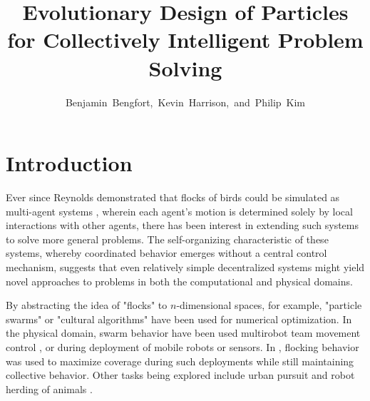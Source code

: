 \documentclass[12pt,journal,compsoc]{IEEEtran}
\begin{document}
\title{Evolutionary Design of Particles for Collectively Intelligent Problem Solving}
\author{Benjamin~Bengfort,~Kevin~Harrison,~and~Philip~Kim}


\maketitle

\IEEEdisplaynotcompsoctitleabstractindextext

\section{Introduction}

Ever since Reynolds demonstrated that flocks of birds could be simulated as multi-agent systems \cite{reynolds1987flocks}, wherein each agent's motion is determined solely by local interactions with other agents, there has been interest in extending such systems to solve more general problems. The self-organizing characteristic of these systems, whereby coordinated behavior emerges without a central control mechanism, suggests that even relatively simple decentralized systems might yield novel approaches to problems in both the computational and physical domains.

By abstracting the idea of "flocks" to $n$-dimensional spaces, for example, "particle swarms" \cite{kennedy1995particle,clerc2002particle} or "cultural algorithms" \cite{chung1996testbed} have been used for numerical optimization. In the physical domain, swarm behavior have been used multirobot team movement control \cite{balch1998behavior,ccelikkanat2010steering,hodgins1994robot}, or during deployment of mobile robots or sensors. In \cite{cheng2009distributed}, flocking behavior was used to maximize coverage during such deployments while still maintaining collective behavior. Other tasks being explored include urban pursuit \cite{winder2004using} and robot herding of animals \cite{vaughan1998robot}.
\end{document}
